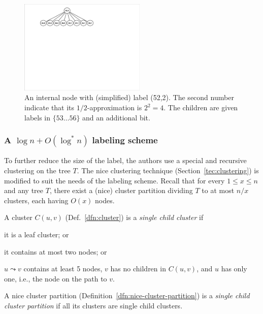  
 				\begin{figure} 
				\centering
				\includegraphics[width=60mm]{./Figures/bitTricks.pdf}
				\caption{An internal node with (simplified) label (52,2). The second number indicate that its $1/2$-approximation is  $2^2 = 4$. The children are given labels in  $\{53 \dots 56\}$ and an additional bit. }
				\label{fig:bitTricks}
			\end{figure}
			
			
 


\subsubsection{A  $\log n + O(\log^*n)$ labeling scheme}\label{sec:log-star}
To further reduce the size of the label, the authors use a special and recursive clustering on the tree $T$. 
The nice clustering  technique (Section~\ref{tec:clustering}) is modified to suit the needs of the labeling scheme.
Recall that for every $ 1 \leq x \leq n$ and any tree $T$, there exist a (nice) cluster partition dividing $T$ to  at most $n / x$ clusters, each having $O(x)$ nodes.
\begin{definition}
A cluster $C(u,v)$ (Def.~\ref{dfn:cluster}) is a \emph{single child cluster} if 
\begin{inparaenum}
\item it is a leaf cluster; or
\item it  contains at most two nodes; or
\item $u \leadsto v$ contains at least 5 nodes, $v$ has no children in $C(u,v)$, and $u$ has only one, i.e., the node on the path to $v$.  
\end{inparaenum}
A nice cluster partition   (Definition~\ref{dfn:nice-cluster-partition})  is a \emph{single child cluster partition} if all its clusters are single child clusters.
\end{definition}

